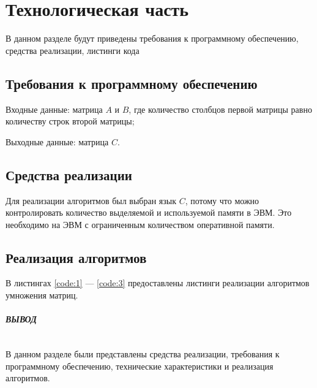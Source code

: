 \chapter{Технологическая часть}
В данном разделе будут приведены требования к программному обеспечению,
средства реализации, листинги кода




\section{Требования к программному обеспечению}

Входные данные: матрица $A$ и  $B$, где количество столбцов первой матрицы равно количеству
строк второй матрицы;

Выходные данные: матрица $C$.




\section{Средства реализации}

Для реализации алгоритмов был выбран язык $C$, потому что
можно контролировать количество выделяемой и используемой памяти
в ЭВМ. Это необходимо на ЭВМ с ограниченным количеством оперативной памяти.

\section{Реализация алгоритмов}

В листингах \ref{code:1} --- \ref{code:3} предоставлены листинги реализации
алгоритмов умножения матриц.

\begin{center}
\captionsetup{justification=raggedright,singlelinecheck=off}

\end{center}



\begin{center}
\captionsetup{justification=raggedright,singlelinecheck=off}

\end{center}


\begin{center}
\captionsetup{justification=raggedright,singlelinecheck=off}

\end{center}

\clearpage

\paragraph*{ВЫВОД} ${}$ \newline

В данном разделе были представлены средства реализации, требования к программному обеспечению,
технические характеристики и реализация алгоритмов.


